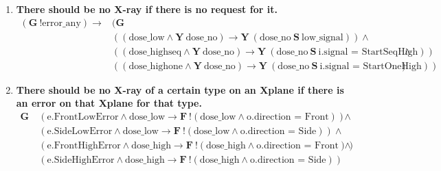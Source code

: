 \documentclass[a4paper,10pt]{article}
\newcommand{\LTLG}{\mathbf{G~}}
\newcommand{\LTLF}{\mathbf{F~}}
\newcommand{\LTLY}{\mathbf{Y~}}
\newcommand{\LTLS}{\mathbf{~S~}}
\newcommand{\imply}{\rightarrow}
\newcommand{\doselow}{\textrm{dose\_low}}
\newcommand{\doseno}{\textrm{dose\_no}}
\newcommand{\dosehigh}{\textrm{dose\_high}}
\newcommand{\dosehighseq}{\textrm{dose\_highseq}}
\newcommand{\dosehighone}{\textrm{dose\_highone}}
\newcommand{\lowsignal}{\textrm{low\_signal}}
\newcommand{\errorany}{\textrm{error\_any}}
\begin{document}
	\begin{enumerate}
		\item \textbf{There should be no X-ray if there is no request for it.}
			\begin{align*}
				(\LTLG !\errorany) \imply & (\LTLG \\
					& ((\doselow \land \LTLY \doseno) \imply \LTLY (\doseno \LTLS \lowsignal)) \land \\
					& ((\dosehighseq \land \LTLY \doseno) \imply \LTLY (\doseno \LTLS \textrm{i.signal = StartSeqHigh})) \land \\
					& ((\dosehighone \land \LTLY \doseno) \imply \LTLY (\doseno \LTLS \textrm{i.signal = StartOneHigh})))
			\end{align*}

		\item \textbf{There should be no X-ray of a certain type on an Xplane if there is an error on that Xplane for that type.}
			\begin{align*}
				\LTLG & (\textrm{e.FrontLowError} \land \doselow \imply \LTLF !(\doselow \land \textrm{o.direction = Front})) \land \\
					& (\textrm{e.SideLowError} \land \doselow \imply \LTLF !(\doselow \land \textrm{o.direction = Side})) \land \\
					& (\textrm{e.FrontHighError} \land \dosehigh \imply \LTLF !(\dosehigh \land \textrm{o.direction = Front})) \land \\
					& (\textrm{e.SideHighError} \land \dosehigh \imply \LTLF !(\dosehigh \land \textrm{o.direction = Side}))
			\end{align*}


\end{enumerate}
\end{document}
